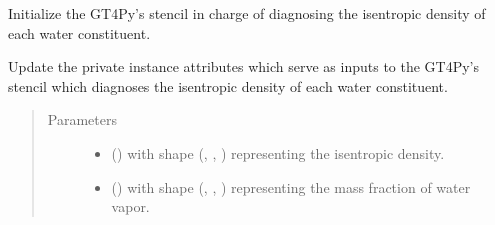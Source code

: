 \documentclass[letterpaper,10pt,english]{sphinxmanual}
\begin{document}
\begin{fulllineitems}
\begin{fulllineitems}
\begin{quote}
\begin{description}
\begin{itemize}
\end{itemize}


\end{description}\end{quote}

\end{fulllineitems}


\begin{fulllineitems}
\label{\detokenize{api:dycore.diagnostic_isentropic.DiagnosticIsentropic._stencil_diagnosing_water_constituents_isentropic_density_initialize}}
Initialize the GT4Py’s stencil in charge of diagnosing the isentropic density of each water constituent.

\end{fulllineitems}


\begin{fulllineitems}
\label{\detokenize{api:dycore.diagnostic_isentropic.DiagnosticIsentropic._stencil_diagnosing_water_constituents_isentropic_density_set_inputs}}
Update the private instance attributes which serve as inputs to the GT4Py’s stencil which diagnoses
the isentropic density of each water constituent.
\begin{quote}\begin{description}
\item[{Parameters}] \leavevmode\begin{itemize}
\item {} 
 () \textendash{}  with shape (, , ) representing the isentropic density.

\item {} 
 () \textendash{}  with shape (, , ) representing the mass fraction of
water vapor.


\end{itemize}
\end{description}
\end{quote}
\end{fulllineitems}
\end{fulllineitems}
\end{document}
